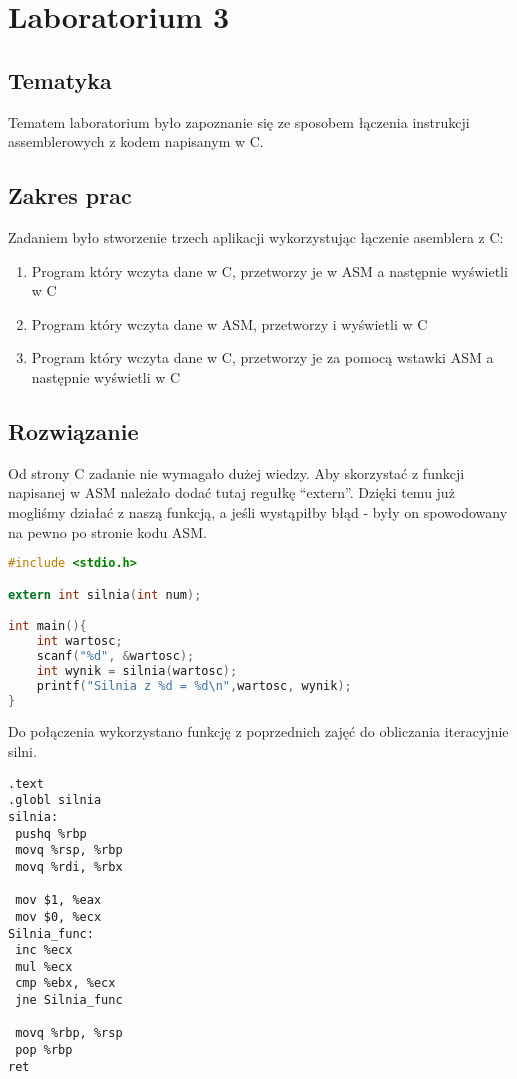 \chapter{Laboratorium 3}
\section{Tematyka}
Tematem laboratorium było zapoznanie się ze sposobem łączenia instrukcji assemblerowych
z kodem napisanym w C.
\section{Zakres prac}
Zadaniem było stworzenie trzech aplikacji wykorzystując łączenie asemblera z C:
\begin{enumerate}
	\item Program który wczyta dane w C, przetworzy je w ASM a następnie wyświetli w C
	\item Program który wczyta dane w ASM, przetworzy i wyświetli w C
	\item Program który wczyta dane w C, przetworzy je za pomocą wstawki ASM a następnie wyświetli w C
\end{enumerate}

\section{Rozwiązanie}
Od strony C zadanie nie wymagało dużej wiedzy. Aby skorzystać z funkcji napisanej w ASM należało dodać tutaj regułkę "`extern"'. Dzięki temu już mogliśmy działać z naszą funkcją, a jeśli wystąpiłby błąd - były on spowodowany na pewno po stronie kodu ASM.
\begin{lstlisting}[language=c, frame=single,showstringspaces=false, basicstyle=\small, caption=Funkcja obliczająca silnie iteracyjnie]
#include <stdio.h>

extern int silnia(int num);

int main(){
	int wartosc;
	scanf("%d", &wartosc);
	int wynik = silnia(wartosc);
	printf("Silnia z %d = %d\n",wartosc, wynik);
}
\end{lstlisting}

Do połączenia wykorzystano funkcję z poprzednich zajęć do obliczania iteracyjnie silni.

\begin{lstlisting}[frame=single, basicstyle=\small, caption=Funkcja obliczająca silnie iteracyjnie]
.text
.globl silnia
silnia:
 pushq %rbp
 movq %rsp, %rbp
 movq %rdi, %rbx

 mov $1, %eax
 mov $0, %ecx
Silnia_func:
 inc %ecx
 mul %ecx
 cmp %ebx, %ecx
 jne Silnia_func

 movq %rbp, %rsp
 pop %rbp
ret
\end{lstlisting}

